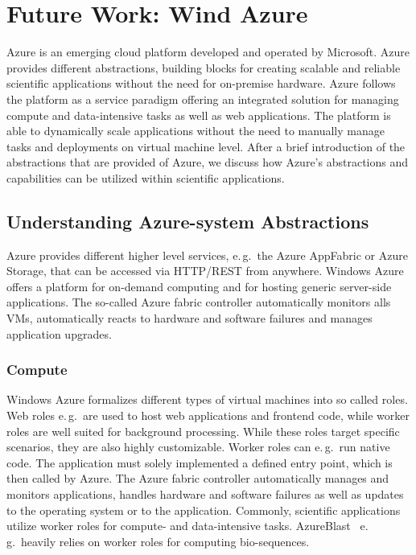 \documentclass[3p,twocolumn]{elsarticle}
\begin{document}
\section{Future Work: Wind Azure}


Azure is an emerging cloud platform developed and operated by Microsoft.
Azure provides different abstractions, building blocks for creating
scalable and reliable scientific applications without the need for
on-premise hardware. Azure follows the platform as a service paradigm
offering an integrated solution for managing compute and
data-intensive tasks as well as web applications. The platform is able
to dynamically scale applications without the need to manually manage
tasks and deployments on virtual machine level. After a brief
introduction of the abstractions that are provided of Azure, we
discuss how Azure's abstractions and capabilities can be utilized
within scientific applications.

\subsection{Understanding Azure-system Abstractions}

Azure provides different higher level services, e.\,g.\ the Azure
AppFabric or Azure Storage, that can be accessed via HTTP/REST from
anywhere. Windows Azure offers a platform for on-demand computing and
for hosting generic server-side applications. The so-called Azure
fabric controller automatically monitors alls VMs, automatically
reacts to hardware and software failures and manages application
upgrades.

\subsubsection{Compute}
Windows Azure formalizes different types of virtual machines into
so called roles. Web roles e.\,g.\ are used to host web applications
and frontend code, while worker roles are well suited for background
processing. While these roles target specific scenarios, they are also
highly customizable. Worker roles can e.\,g.\ run native code. The
application must solely implemented a defined entry point, which is
then called by Azure. The Azure fabric controller automatically
manages and monitors applications, handles hardware and software
failures as well as updates to the operating system or to the
application.  Commonly, scientific applications utilize worker roles
for compute- and data-intensive tasks. AzureBlast~\cite{azure_blast}
e.\,g.\ heavily relies on worker roles for computing bio-sequences.
\end{document}
